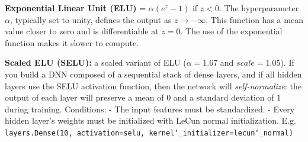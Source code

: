 \textbf{Exponential Linear Unit (ELU)} = $\alpha(e^z - 1)$ if $z < 0$.
The hyperparameter $\alpha$, typically set to unity, defines the output as $z \rightarrow -\infty$.
This function has a mean value closer to zero and is differentiable at $z=0$.
The use of the exponential function makes it slower to compute.

\textbf{Scaled ELU (SELU):} a scaled variant of ELU ($\alpha = 1.67$ and $scale = 1.05$).\newline
If you build a DNN composed of a sequential stack of dense layers,
and if all hidden layers use the SELU activation function,
then the network will \textit{self-normalize}:
the output of each layer will preserve a mean of 0 and a standard deviation of 1 during training. Conditions:\newline
- The input features must be standardized.\newline
- Every hidden layer's weights must be initialized with LeCun normal initialization. E.g.\newline
\texttt{layers.Dense(10, activation=\textquotesingle selu\textquotesingle, kernel\char`_initializer=\textquotesingle lecun\char`_normal\textquotesingle)}


\newpage
